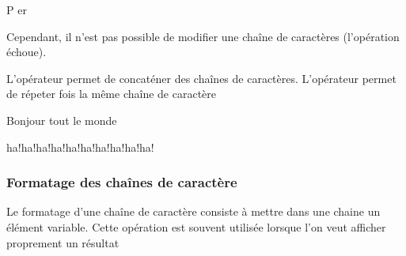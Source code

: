 \documentclass[letterpaper,10pt,english]{sphinxhowto}
\begin{document}
\begin{sphinxVerbatim}[commandchars=\\\{\}]
P
er
\end{sphinxVerbatim}

\sphinxAtStartPar
Cependant, il n’est pas possible de modifier une chaîne de caractères (l’opération  échoue).

\sphinxAtStartPar
L’opérateur \sphinxcode{\sphinxupquote{+}} permet de concaténer des chaînes de caractères. L’opérateur \sphinxcode{\sphinxupquote{*}} permet de répeter  fois la même chaîne de caractère

\begin{sphinxVerbatim}[commandchars=\\\{\}]
  
  
    
\end{sphinxVerbatim}

\begin{sphinxVerbatim}[commandchars=\\\{\}]
Bonjour tout le monde
\end{sphinxVerbatim}

\begin{sphinxVerbatim}[commandchars=\\\{\}]
\end{sphinxVerbatim}

\begin{sphinxVerbatim}[commandchars=\\\{\}]
ha!ha!ha!ha!ha!ha!ha!ha!ha!ha!
\end{sphinxVerbatim}


\subsubsection{Formatage des chaînes de caractère}
\label{\detokenize{cours4_chaine_caractere_cours:formatage-des-chaines-de-caractere}}
\sphinxAtStartPar
Le formatage d’une chaîne de caractère consiste à mettre dans une chaine un élément variable. Cette opération est souvent utilisée lorsque l’on veut afficher proprement
un résultat
\end{document}

